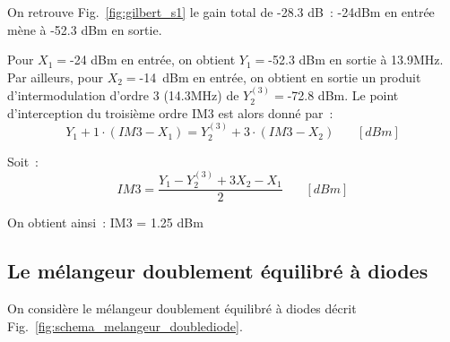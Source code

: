 \documentclass{article}
\begin{document}
On retrouve Fig.~\ref{fig:gilbert_s1} le gain total de -28.3 dB~: -24dBm en entrée mène à -52.3 dBm en sortie.

Pour $X_1 = $-24 dBm en entrée, on obtient $Y_1 = $-52.3 dBm en sortie à 13.9MHz. Par ailleurs, pour $X_2 = $-14~dBm en entrée, on obtient en sortie un produit d'intermodulation d'ordre 3 (14.3MHz) de $Y_2^{(3)} = $-72.8 dBm. Le point d'interception du troisième ordre IM3 est alors donné par~:
\begin{equation*}
Y_1 + 1\cdot(IM3-X_1) = Y_2^{(3)}+3\cdot(IM3-X_2)~~~~~~~~[dBm]
\end{equation*}

Soit~: 
\begin{equation*}
IM3=\frac{Y_1 - Y_2^{(3)} + 3 X_2 - X_1}{2}~~~~~~~~[dBm]
\end{equation*}

On obtient ainsi~: IM3 = 1.25 dBm

%





\subsection{Le mélangeur doublement équilibré à diodes}

On considère le mélangeur doublement équilibré à diodes décrit Fig.~\ref{fig:schema_melangeur_doublediode}.
\end{document}
